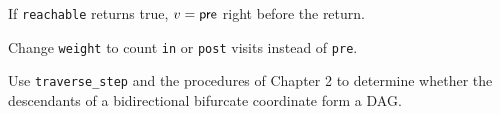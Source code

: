 \begin{lemma}
	If \verb|reachable| returns true, $v = \mathsf{pre}$ right before the return.
\end{lemma}

\begin{exercise}
	Change \verb|weight| to count \verb|in| or \verb|post| visits instead of \verb|pre|.
\end{exercise}



\begin{exercise}
	Use \verb|traverse_step| and the procedures of Chapter 2 to determine whether the
	descendants of a bidirectional bifurcate coordinate form a DAG.
\end{exercise}
